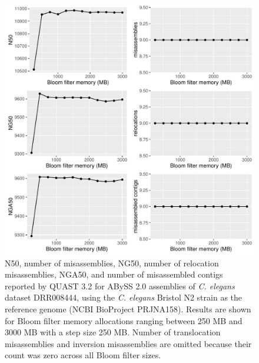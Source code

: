 \documentclass[
  12pt,
  oneside,
  openany]{book}
\begin{document}
\begin{appendices}
\begin{figure}
\hypertarget{fig:fpr1}{%
\centering
\includegraphics{abyss2-appendix/quast-a.pdf}
\caption[N50, number of misassemblies, NG50, number of relocation misassemblies, NGA50, and number of misassembled contigs reported by QUAST 3.2 for ABySS 2.0 assemblies of \emph{C. elegans} dataset DRR008444, using the \emph{C. elegans} Bristol N2 strain as the reference genome (NCBI BioProject PRJNA158).]{N50, number of misassemblies, NG50, number of relocation misassemblies, NGA50, and number of misassembled contigs reported by QUAST 3.2 for ABySS 2.0 assemblies of \emph{C. elegans} dataset DRR008444, using the \emph{C. elegans} Bristol N2 strain as the reference genome (NCBI BioProject PRJNA158). Results are shown for Bloom filter memory allocations ranging between 250 MB and 3000 MB with a step size 250 MB. Number of translocation misassemblies and inversion misassemblies are omitted because their count was zero across all Bloom filter sizes.}\label{fig:fpr1}
}
\end{figure}


\end{appendices}
\end{document}
